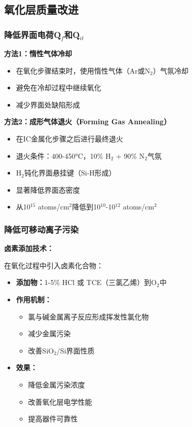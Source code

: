 \documentclass[UTF8,12pt,a4paper]{ctexart}
\begin{document}
\subsection{氧化层质量改进}

\subsubsection{降低界面电荷Q$_f$和Q$_{it}$}

\textbf{方法1：惰性气体冷却}
\begin{itemize}
    \item 在氧化步骤结束时，使用惰性气体（Ar或N$_2$）气氛冷却
    \item 避免在冷却过程中继续氧化
    \item 减少界面处缺陷形成
\end{itemize}

\textbf{方法2：成形气体退火（Forming Gas Annealing）}
\begin{itemize}
    \item 在IC金属化步骤之后进行最终退火
    \item 退火条件：400-450°C，10\% H$_2$ + 90\% N$_2$气氛
    \item H$_2$钝化界面悬挂键（Si-H形成）
    \item 显著降低界面态密度
    \item 从10$^{15}$ atoms/cm$^2$降低到10$^{10}$-10$^{12}$ atoms/cm$^2$
\end{itemize}

\subsubsection{降低可移动离子污染}

\textbf{卤素添加技术：}

在氧化过程中引入卤素化合物：

\begin{itemize}
    \item \textbf{添加物：}1-5\% HCl 或 TCE（三氯乙烯）到O$_2$中
    \item \textbf{作用机制：}
    \begin{itemize}
        \item 氯与碱金属离子反应形成挥发性氯化物
        \item 减少金属污染
        \item 改善SiO$_2$/Si界面性质
    \end{itemize}
    \item \textbf{效果：}
    \begin{itemize}
        \item 降低金属污染浓度
        \item 改善氧化层电学性能
        \item 提高器件可靠性
    \end{itemize}
\end{itemize}
\end{document}
